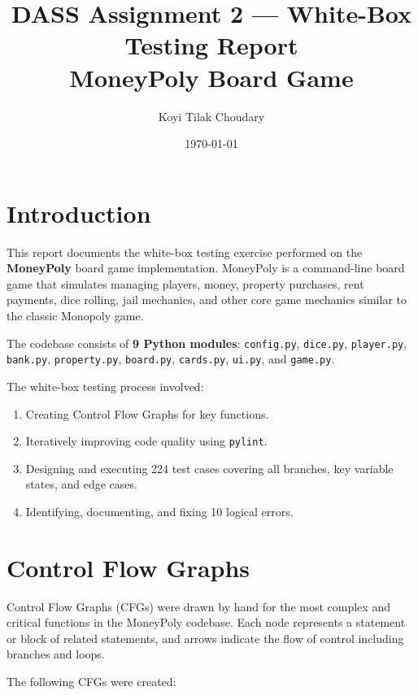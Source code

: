 \documentclass[12pt,a4paper]{article}
\title{\textbf{DASS Assignment 2 --- White-Box Testing Report}\\[0.5em]
\large MoneyPoly Board Game}
\author{Koyi Tilak Choudary}
\date{\today}
\begin{document}
\maketitle
\tableofcontents
\newpage

\section{Introduction}

This report documents the white-box testing exercise performed on the \textbf{MoneyPoly} board game implementation. MoneyPoly is a command-line board game that simulates managing players, money, property purchases, rent payments, dice rolling, jail mechanics, and other core game mechanics similar to the classic Monopoly game.

The codebase consists of \textbf{9 Python modules}: \texttt{config.py}, \texttt{dice.py}, \texttt{player.py}, \texttt{bank.py}, \texttt{property.py}, \texttt{board.py}, \texttt{cards.py}, \texttt{ui.py}, and \texttt{game.py}.

The white-box testing process involved:
\begin{enumerate}
  \item Creating Control Flow Graphs for key functions.
  \item Iteratively improving code quality using \texttt{pylint}.
  \item Designing and executing 224 test cases covering all branches, key variable states, and edge cases.
  \item Identifying, documenting, and fixing 10 logical errors.
\end{enumerate}

\section{Control Flow Graphs}

Control Flow Graphs (CFGs) were drawn by hand for the most complex and critical functions in the MoneyPoly codebase. Each node represents a statement or block of related statements, and arrows indicate the flow of control including branches and loops.

The following CFGs were created:
\end{document}
